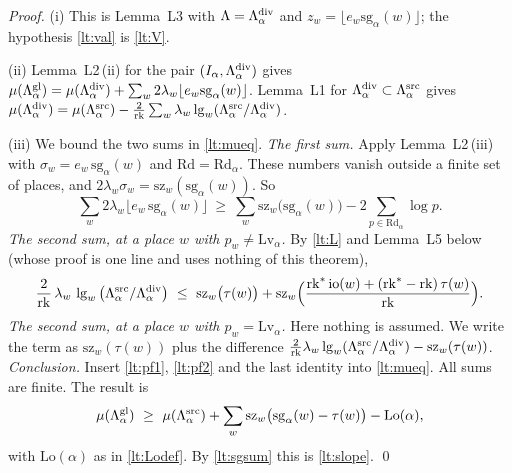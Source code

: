 \documentclass[11pt,letterpaper]{article}
\begin{document}
\emph{Proof.} (i) This is Lemma~L3 with $\Lambda=\Lambda^{\rm div}_\alpha$ and
$z_w=\lfloor e_w\mathrm{sg}_\alpha(w)\rfloor$; the hypothesis \eqref{lt:val} is \eqref{lt:V}.

(ii) Lemma~L2\,(ii) for the pair $(I_\alpha,\Lambda^{\rm div}_\alpha)$ gives
$\mu(\Lambda^{\rm gl}_\alpha)=\mu(\Lambda^{\rm div}_\alpha)+\sum_w2\lambda_w\lfloor e_w\mathrm{sg}_\alpha(w)\rfloor$.
Lemma~L1 for $\Lambda^{\rm div}_\alpha\subset\Lambda^{\rm src}_\alpha$ gives
$\mu(\Lambda^{\rm div}_\alpha)=\mu(\Lambda^{\rm src}_\alpha)-\frac2{\mathrm{rk}}\sum_w\lambda_w\lg_w(\Lambda^{\rm src}_\alpha/\Lambda^{\rm div}_\alpha)$.

(iii) We bound the two sums in \eqref{lt:mueq}. \emph{The first sum.} Apply Lemma~L2\,(iii) with
$\sigma_w=e_w\,\mathrm{sg}_\alpha(w)$ and $\mathrm{Rd}=\mathrm{Rd}_\alpha$. These numbers vanish outside a
finite set of places, and $2\lambda_w\sigma_w=\mathrm{sz}_w(\mathrm{sg}_\alpha(w))$. So
\begin{equation}\label{lt:pf1}
 \sum_w2\lambda_w\big\lfloor e_w\,\mathrm{sg}_\alpha(w)\big\rfloor\ \ge\
 \sum_w\mathrm{sz}_w\big(\mathrm{sg}_\alpha(w)\big)-2\sum_{p\in\mathrm{Rd}_\alpha}\log p .
\end{equation}
\emph{The second sum, at a place $w$ with $p_w\ne\mathrm{Lv}_\alpha$.} By \eqref{lt:L} and Lemma~L5 below
(whose proof is one line and uses nothing of this theorem),
\begin{equation}\label{lt:pf2}
 \frac2{\mathrm{rk}}\,\lambda_w\,\lg_w\big(\Lambda^{\rm src}_\alpha/\Lambda^{\rm div}_\alpha\big)\ \le\
 \mathrm{sz}_w\big(\tau(w)\big)
 +\mathrm{sz}_w\Big(\frac{\mathrm{rk}^*\,\mathrm{io}(w)+(\mathrm{rk}^*-\mathrm{rk})\,\tau(w)}{\mathrm{rk}}\Big).
\end{equation}
\emph{The second sum, at a place $w$ with $p_w=\mathrm{Lv}_\alpha$.} Here nothing is assumed. We write the
term as $\mathrm{sz}_w(\tau(w))$ plus the difference
$\frac2{\mathrm{rk}}\lambda_w\lg_w(\Lambda^{\rm src}_\alpha/\Lambda^{\rm div}_\alpha)-\mathrm{sz}_w(\tau(w))$.
\emph{Conclusion.} Insert \eqref{lt:pf1}, \eqref{lt:pf2} and the last identity into \eqref{lt:mueq}. All
sums are finite. The result is
\begin{equation}\label{D:225}
 \mu(\Lambda^{\rm gl}_\alpha)\ \ge\ \mu(\Lambda^{\rm src}_\alpha)
 +\sum_w\mathrm{sz}_w\big(\mathrm{sg}_\alpha(w)-\tau(w)\big)-\mathrm{Lo}(\alpha),
\end{equation}
with $\mathrm{Lo}(\alpha)$ as in \eqref{lt:Lodef}. By \eqref{lt:sgsum} this is \eqref{lt:slope}. \qed
\end{document}
